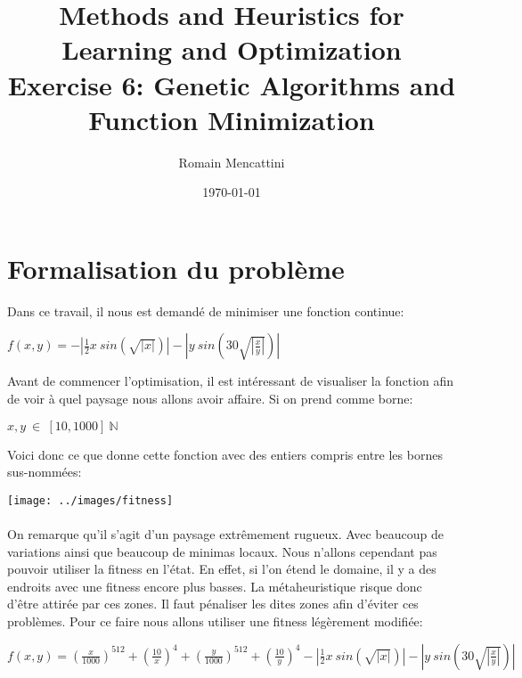 \documentclass[a4paper, 11pt]{article}
\title{Methods and Heuristics for Learning and Optimization\\Exercise 6: Genetic Algorithms and Function Minimization}
\author{Romain Mencattini}
\date{\today}
\begin{document}
\maketitle
\newpage
\tableofcontents
\newpage

\section{Formalisation du problème}
Dans ce travail, il nous est demandé de minimiser une fonction continue:
\begin{center}
 \begin{math}
  f(x,y) = - \left| \frac{1}{2} x\  sin(\sqrt{\left| x \right|})\right| - \left| y\  sin(30 \sqrt{\left| \frac{x}{y}\right|})\right|
 \end{math}
\end{center}

Avant de commencer l'optimisation, il est intéressant de visualiser la fonction afin de voir à quel paysage nous allons avoir affaire.
Si on prend comme borne:
\begin{center}
 \begin{math}
  x,y \ \in \ [10,1000] \ \mathbb{N}
 \end{math}
\end{center}
Voici donc ce que donne cette fonction avec des entiers compris entre les bornes sus-nommées:
\begin{center}
\texttt{[image: ../images/fitness]} 
\end{center}

\paragraph{}
On remarque qu'il s'agit d'un paysage extrêmement rugueux. Avec beaucoup de variations ainsi que beaucoup de minimas locaux.
Nous n'allons cependant pas pouvoir utiliser la fitness en l'état. En effet, si l'on étend le domaine, il y a des endroits avec une fitness
encore plus basses. La métaheuristique risque donc d'être attirée par ces zones.
Il faut pénaliser les dites zones afin d'éviter ces problèmes.
Pour ce faire nous allons utiliser une fitness légèrement modifiée:
\begin{center}
 \begin{math}
  f(x,y) = (\frac{x}{1000})^{512} + (\frac{10}{x})^4 + (\frac{y}{1000})^{512} + (\frac{10}{y})^4 
  - \left| \frac{1}{2} x\  sin(\sqrt{\left| x \right|})\right| - \left| y\  sin(30 \sqrt{\left| \frac{x}{y}\right|})\right|
 \end{math}
\end{center}
\end{document}
